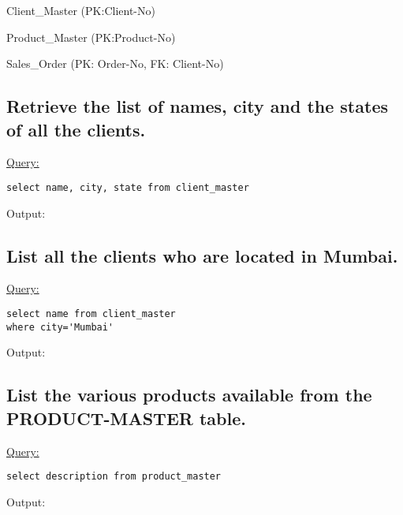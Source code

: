 \documentclass[a4paper,11pt]{article}
\begin{document}
\LARGE{Client\_Master (PK:Client-No)}

\bigskip

\bigskip

\footnotesize{}

\bigskip
\LARGE{Product\_Master  (PK:Product-No)}

\bigskip
\large{}

\bigskip
\LARGE{Sales\_Order (PK: Order-No, FK: Client-No)}

\bigskip

\bigskip
\subsection{Retrieve the list of names, city and the states of all the clients.}
\underline{Query:}
\begin{lstlisting}[showstringspaces=false]
select name, city, state from client_master
\end{lstlisting}
Output:
\begin{figure}[H]
\centering
{}
\end{figure}
\bigskip

\subsection{List all the clients who are located in Mumbai.}
\underline{Query:}
\begin{lstlisting}[showstringspaces=false]
select name from client_master
where city='Mumbai'
\end{lstlisting}
Output:
\begin{figure}[H]
\centering
\end{figure}
\bigskip

\subsection{List the various products available from the PRODUCT-MASTER table.}
\underline{Query:}
\begin{lstlisting}[showstringspaces=false]
select description from product_master
\end{lstlisting}
Output:
\begin{figure}[H]
\centering
{}
\end{figure}
\bigskip
\end{document}
